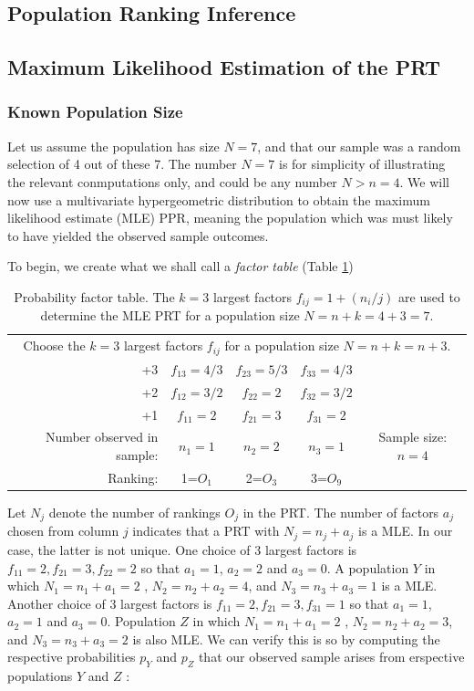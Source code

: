 \documentclass[a4paper, 12pt]{article}
\begin{document}
\subsection{Population Ranking Inference}
\subsection{Maximum Likelihood Estimation of the PRT}

\subsubsection{Known Population Size}
Let us assume the population has size $N=7$, and that our sample was a random selection of 4 out of these 7. The number $N=7$ is for simplicity of illustrating the relevant conmputations only, and could be any number $N>n=4$.  We will now use a multivariate hypergeometric distribution to obtain the maximum likelihood estimate (MLE) PPR, meaning the population which was must likely to have yielded the observed sample outcomes.  

To begin, we create what we shall call a \emph{factor table} (Table \ref{FT}) 
\begin{table}[!htpb]
	\scriptsize
	\centering
	\begin{tabular}{r|ccc|c}\hline
		\multicolumn{5}{c}{Choose the $k=3$ largest factors $f_{ij}$ for a population size $N=n+k=n+3$.}\\ 
		+3& $f_{13}=4/3$ & $f_{23}=5/3$&$f_{33}=4/3$&\\
		+2& $f_{12}=3/2$ & $f_{22}=2$ &$f_{32}=3/2 $&\\
		+1& $f_{11}=2$  &$f_{21}=3$&$f_{31}=2 $ &\\\hline
		Number observed in sample:&$n_1=1$& $n_2=2$ & $n_3=1$ & Sample size: $n=4$\\\hline
		Ranking:&1=$O_1$&2=$O_3$&3=$O_9$
	\end{tabular}
	\caption{Probability factor table. The $k=3$ largest factors $f_{ij}=1+(n_i/j)$ are used to determine the MLE PRT for a population size $N=n+k=4+3=7$. }
	\label{FT}
\end{table}
{\flushleft  Let} $N_j$ denote the number of rankings $O_j$ in the PRT.  The number of factors $a_j$ chosen from column $j$ indicates that a  PRT with $N_j= n_j+a_j$ is a MLE.    In our case, the latter is not unique.  One choice of 3 largest factors is $f_{11}=2, f_{21}=3,f_{22}=2$ so that $a_1=1$, $a_2=2$ and $a_3=0$. A population $Y$ in which $N_1=n_1+a_1=2$ , $N_2=n_2+a_2=4$, and $N_3=n_3+a_3=1$ is a MLE. Another choice of 3 largest factors  is $f_{11}=2, f_{21}=3,f_{31}=1$ so that $a_1=1$, $a_2=1$ and $a_3=0$. Population $Z$ in which $N_1=n_1+a_1=2$ , $N_2=n_2+a_2=3$, and $N_3=n_3+a_3=2$ is also MLE. We can verify this is so by computing the respective probabilities $p_Y$ and $p_Z$ that our observed sample arises from erspective populations $Y$ and $Z$ :
\end{document}
